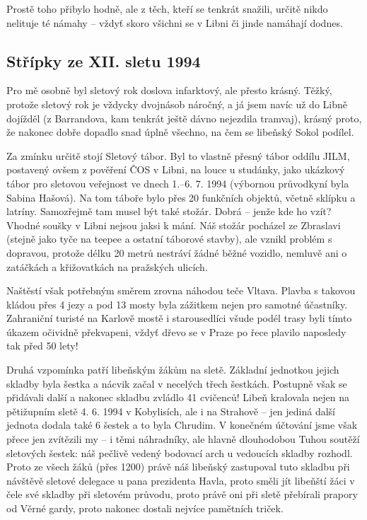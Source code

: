 Prostě toho přibylo hodně, ale z těch, kteří se tenkrát snažili, určitě
nikdo nelituje té námahy -- vždyť skoro všichni se v Libni či jinde
namáhají dodnes.

\subsection{Střípky ze XII. sletu
1994}\label{stux159uxedpky-ze-xii.-sletu-1994}

Pro mě osobně byl sletový rok doslova infarktový, ale přesto krásný.
Těžký, protože sletový rok je vždycky dvojnásob náročný, a já jsem navíc
už do Libně dojížděl (z Barrandova, kam tenkrát ještě dávno nejezdila
tramvaj), krásný proto, že nakonec dobře dopadlo snad úplně všechno, na
čem se libeňský Sokol podílel.

Za zmínku určitě stojí Sletový tábor. Byl to vlastně přesný tábor oddílu
JILM, postavený ovšem z pověření ČOS v Libni, na louce u studánky, jako
ukázkový tábor pro sletovou veřejnost ve dnech 1.--6. 7. 1994 (výbornou
průvodkyní byla Sabina Hašová). Na tom táboře bylo přes 20 funkčních
objektů, včetně sklípku a latríny. Samozřejmě tam musel být také stožár.
Dobrá -- jenže kde ho vzít? Vhodné soušky v Libni nejsou jaksi k mání.
Náš stožár pocházel ze Zbraslavi (stejně jako tyče na teepee a ostatní
táborové stavby), ale vznikl problém s dopravou, protože délku 20 metrů
nestráví žádné běžné vozidlo, nemluvě ani o zatáčkách a křižovatkách na
pražských ulicích.

Naštěstí však potřebným směrem zrovna náhodou teče Vltava. Plavba s
takovou kládou přes 4 jezy a pod 13 mosty byla zážitkem nejen pro
samotné účastníky. Zahraniční turisté na Karlově mostě i starousedlíci
všude podél trasy byli tímto úkazem očividně překvapeni, vždyť dřevo se
v Praze po řece plavilo naposledy tak před 50 lety!

Druhá vzpomínka patří libeňským žákům na sletě. Základní jednotkou
jejich skladby byla šestka a nácvik začal v necelých třech šestkách.
Postupně však se přidávali další a nakonec skladbu zvládlo 41 cvičenců!
Libeň kralovala nejen na pětižupním sletě 4. 6. 1994 v Kobylisích, ale i
na Strahově -- jen jediná další jednota dodala také 6 šestek a to byla
Chrudim. V konečném účtování jsme však přece jen zvítězili my -- i těmi
náhradníky, ale hlavně dlouhodobou Tuhou soutěží sletových šestek: náš
pečlivě vedený bodovací arch u vedoucích skladby rozhodl. Proto ze všech
žáků (přes 1200) právě náš libeňský zastupoval tuto skladbu při návštěvě
sletové delegace u pana prezidenta Havla, proto směli jít libeňští žáci
v čele své skladby při sletovém průvodu, proto právě oni při sletě
přebírali prapory od Věrné gardy, proto nakonec dostali nejvíce
pamětních triček.

